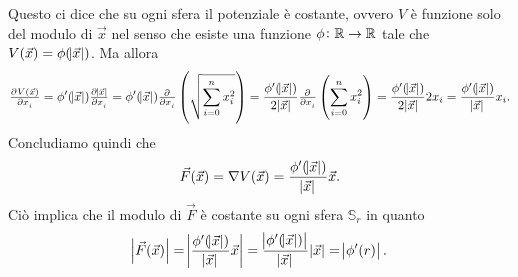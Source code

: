 \documentclass[a4paper]{article}\par \usepackage{style}\par
\begin{document}
\begin{enumerate}[label = (\roman*)]
\begin{equation*}
  \end{equation*}
  Questo ci dice che su ogni sfera il potenziale è costante, ovvero $ V $ è funzione solo del modulo di $ \vec{x} $ nel senso che esiste una funzione $ \phi \colon \mathbb{R} \to \mathbb{R} $ tale che $ V(\vec{x}) = \phi(\abs{\vec{x}}) $. Ma allora \[\pd[]{V(\vec{x})}{x_i} = \phi'(\abs{\vec{x}}) \pd[]{\abs{\vec{x}}}{x_i} = \phi'(\abs{\vec{x}}) \pd[]{}{x_i} \left(\sqrt{\sum_{i = 0}^{n} x_i^2}\right) = \frac{\phi'(\abs{\vec{x}})}{2 \abs{\vec{x}}} \pd[]{}{x_i} \left(\sum_{i = 0}^{n} x_i^2\right) = \frac{\phi'(\abs{\vec{x}})}{2 \abs{\vec{x}}} 2 x_i = \frac{\phi'(\abs{\vec{x}})}{\abs{\vec{x}}} x_i.\] Concludiamo quindi che \[\vec{F}(\vec{x}) = \nabla{V}(\vec{x}) = \frac{\phi'(\abs{\vec{x}})}{\abs{\vec{x}}} \vec{x}.\] Ciò implica che il modulo di $ \vec{F} $ è costante su ogni sfera $ \mathbb{S}_r $ in quanto \[\abs{\vec{F}(\vec{x})} = \abs{\frac{\phi'(\abs{\vec{x}})}{\abs{\vec{x}}} \vec{x}} = \frac{\abs{\phi'(\abs{\vec{x}})}}{\abs{\vec{x}}} \abs{\vec{x}} = \abs{\phi'(r)}.\]
\end{enumerate}\par 
\end{document}
